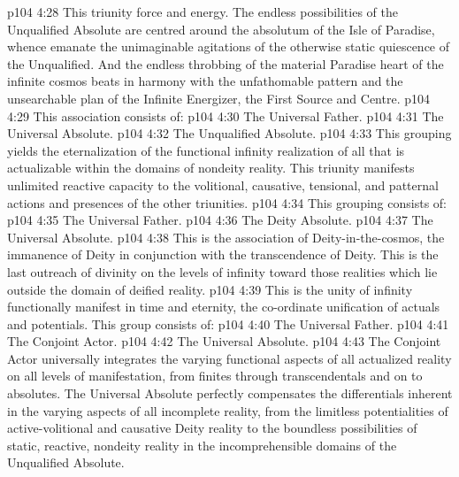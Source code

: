 \vs p104 4:28 This triunity  force and energy. The endless possibilities of the Unqualified Absolute are centred around the absolutum of the Isle of Paradise, whence emanate the unimaginable agitations of the otherwise static quiescence of the Unqualified. And the endless throbbing of the material Paradise heart of the infinite cosmos beats in harmony with the unfathomable pattern and the unsearchable plan of the Infinite Energizer, the First Source and Centre.
\vs p104 4:29 \pc {} This association consists of:
\vs p104 4:30 \bibnobreakspace The Universal Father.
\vs p104 4:31 \bibnobreakspace The Universal Absolute.
\vs p104 4:32 \bibnobreakspace The Unqualified Absolute.
\vs p104 4:33 \pc This grouping yields the eternalization of the functional infinity realization of all that is actualizable within the domains of nondeity reality. This triunity manifests unlimited reactive capacity to the volitional, causative, tensional, and patternal actions and presences of the other triunities.
\vs p104 4:34 \pc {} This grouping consists of:
\vs p104 4:35 \bibnobreakspace The Universal Father.
\vs p104 4:36 \bibnobreakspace The Deity Absolute.
\vs p104 4:37 \bibnobreakspace The Universal Absolute.
\vs p104 4:38 This is the association of Deity\hyp{}in\hyp{}the\hyp{}cosmos, the immanence of Deity in conjunction with the transcendence of Deity. This is the last outreach of divinity on the levels of infinity toward those realities which lie outside the domain of deified reality.
\vs p104 4:39 \pc {} This is the unity of infinity functionally manifest in time and eternity, the co\hyp{}ordinate unification of actuals and potentials. This group consists of:
\vs p104 4:40 \bibnobreakspace The Universal Father.
\vs p104 4:41 \bibnobreakspace The Conjoint Actor.
\vs p104 4:42 \bibnobreakspace The Universal Absolute.
\vs p104 4:43 \pc The Conjoint Actor universally integrates the varying functional aspects of all actualized reality on all levels of manifestation, from finites through transcendentals and on to absolutes. The Universal Absolute perfectly compensates the differentials inherent in the varying aspects of all incomplete reality, from the limitless potentialities of active\hyp{}volitional and causative Deity reality to the boundless possibilities of static, reactive, nondeity reality in the incomprehensible domains of the Unqualified Absolute.
